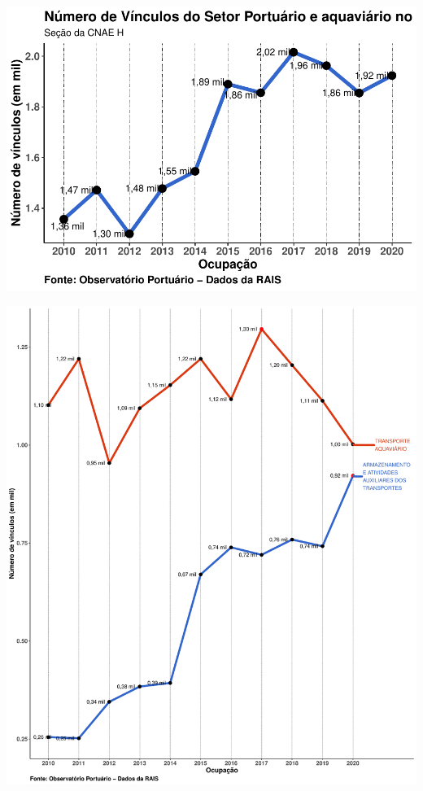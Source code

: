 \documentclass[
]{article}
\begin{document}
\includegraphics{mercado_trabalho_files/figure-latex/g_secao_ma-1.pdf}

\includegraphics{mercado_trabalho_files/figure-latex/g_divisao_ma-1.pdf}
\end{document}
